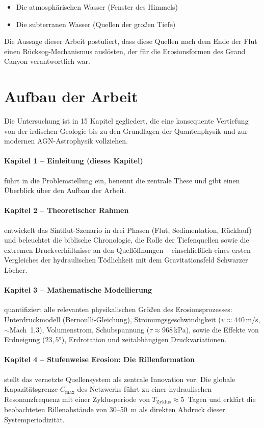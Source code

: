 ﻿\documentclass[12pt,a4paper]{report}
\begin{document}
\begin{itemize}
	\item Die atmosphärischen Wasser (Fenster des Himmels)
	\item Die subterranen Wasser (Quellen der großen Tiefe)
\end{itemize}

Die Aussage dieser Arbeit postuliert, dass diese Quellen nach dem Ende der Flut einen Rücksog-Mechanismus auslösten, der für die Erosionsformen des Grand Canyon verantwortlich war.

\section{Aufbau der Arbeit}

Die Untersuchung ist in 15 Kapitel gegliedert, die eine konsequente Vertiefung von der irdischen Geologie bis zu den Grundlagen der Quantenphysik und zur modernen AGN-Astrophysik vollziehen.

\paragraph{Kapitel 1 -- Einleitung (dieses Kapitel)}
führt in die Problemstellung ein, benennt die zentrale These und gibt einen Überblick über den Aufbau der Arbeit.

\paragraph{Kapitel 2 -- Theoretischer Rahmen}
entwickelt das Sintflut-Szenario in drei Phasen (Flut, Sedimentation, Rücklauf) und beleuchtet die biblische Chronologie, die Rolle der Tiefenquellen sowie die extremen Druckverhältnisse an den Quellöffnungen -- einschließlich eines ersten Vergleiches der hydraulischen Tödlichkeit mit dem Gravitationsfeld Schwarzer Löcher.

\paragraph{Kapitel 3 -- Mathematische Modellierung}
quantifiziert alle relevanten physikalischen Größen des Erosionsprozesses: Unterdruckmodell (Bernoulli-Gleichung), Strömungsge\-schwindigkeit ($v \approx 440$\,m/s, $\sim$Mach~1,3), Volumenstrom, Schubspannung ($\tau \approx 968$\,kPa), sowie die Effekte von Erdneigung ($23{,}5 °$), Erdrotation und zeitabhängigen Druckvariationen.

\paragraph{Kapitel 4 -- Stufenweise Erosion: Die Rillenformation}
stellt das vernetzte Quellensystem als zentrale Innovation vor. Die globale Kapazitätsgrenze $C_\mathrm{max}$ des Netzwerks führt zu einer hydraulischen Resonanzfrequenz mit einer Zyklusperiode von $T_\mathrm{Zyklus} \approx 5$~Tagen und erklärt die beobachteten Rillenabstände von 30--50~m als direkten Abdruck dieser Systemperiodizität.
\end{document}
